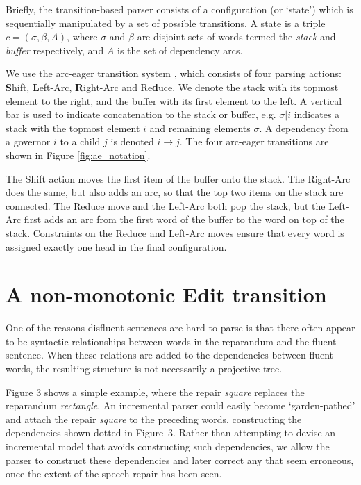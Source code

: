 \documentclass[11pt,letterpaper]{article}
\begin{document}
Briefly, the transition-based parser consists of a configuration (or `state') which
is sequentially manipulated by a set of possible transitions.  A state is a triple
$c = (\sigma, \beta, A)$, where $\sigma$ and $\beta$ are disjoint sets of words
termed the \emph{stack} and \emph{buffer} respectively, and $A$ is the set of
dependency arcs.

We use the arc-eager transition system \citep{nivre:03,nivre:cl}, which consists
of four parsing actions:  \textbf{S}hift, \textbf{L}eft-Arc,
\textbf{R}ight-Arc and Re\textbf{d}uce.
We denote the stack with its topmost element
to the right, and the buffer with its first element to the left. A vertical bar
is used to indicate concatenation to the stack or buffer, e.g. $\sigma | i$ indicates
a stack with the topmost element $i$ and remaining elements $\sigma$.  
A dependency from a governor $i$ to a child $j$ is denoted $i \rightarrow j$.
The four arc-eager transitions are shown in Figure \ref{fig:ae_notation}.

The Shift action moves the first item of the buffer onto the stack.
The Right-Arc does the same, but also adds an arc, so that the top two items
on the stack are connected. The Reduce move and the Left-Arc both pop the stack,
but the Left-Arc first adds an arc from the first word of the buffer to the word
on top of the stack. Constraints on the Reduce and Left-Arc
moves ensure that every word is assigned exactly one head in the final configuration.




\section{A non-monotonic Edit transition}
\label{sec:edittrans}

One of the reasons disfluent sentences are hard to parse is that there often appear
to be syntactic relationships between words in the reparandum and the fluent sentence.
When these relations are added to the dependencies between fluent words,
the resulting structure is not necessarily a projective tree.


Figure 3 shows a simple example, where the repair {\em square} replaces the
reparandum {\em rectangle}.  An incremental parser could easily become
`garden-pathed' and attach the repair {\em square} to the preceding words,
constructing the dependencies shown dotted in Figure~3.  Rather than attempting
to devise an incremental model that avoids constructing such dependencies, we
allow the parser to construct these dependencies and later correct any that seem
erroneous, once the extent of the speech repair has been seen.
\end{document}
